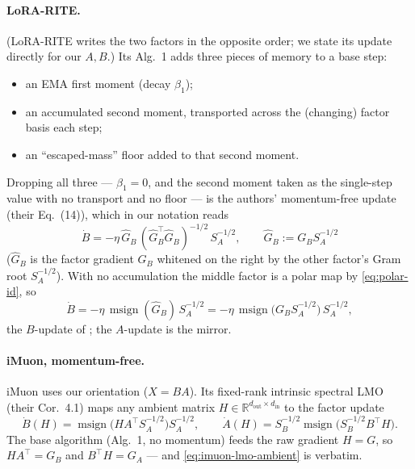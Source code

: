 \documentclass[11pt]{article}
\newcommand{\R}{\mathbb{R}}
\DeclareMathOperator{\polar}{msign}          %
\theoremstyle{plain}
\theoremstyle{definition}
\theoremstyle{remark}
\begin{document}
\paragraph{LoRA-RITE.} (LoRA-RITE writes the two factors in the opposite order; we state its
update directly for our $A,B$.) Its Alg.~1 adds three pieces of memory to a base step:
\begin{itemize}[leftmargin=1.5em,itemsep=1pt,topsep=2pt]
  \item an EMA first moment (decay $\beta_1$);
  \item an accumulated second moment, transported across the (changing) factor basis each step;
  \item an ``escaped-mass'' floor added to that second moment.
\end{itemize}
Dropping all three --- $\beta_1{=}0$, and the second moment taken as the single-step value
with no transport and no floor --- is the authors' momentum-free update (their Eq.~(14)),
which in our notation reads
\begin{equation*}
  \dot B=-\eta\,\widehat G_B\,(\widehat G_B^\top\widehat G_B)^{-1/2}\,S_A^{-1/2},
  \qquad \widehat G_B:=G_B S_A^{-1/2}
\end{equation*}
($\widehat G_B$ is the factor gradient $G_B$ whitened on the right by the other factor's Gram root $S_A^{-1/2}$).
With no accumulation the middle factor is a polar map by \eqref{eq:polar-id}, so
\begin{equation*}
  \dot B=-\eta\,\polar(\widehat G_B)\,S_A^{-1/2}
  =-\eta\,\polar\!\big(G_B S_A^{-1/2}\big)\,S_A^{-1/2},
\end{equation*}
the $B$-update of ; the $A$-update is the mirror.

\paragraph{iMuon, momentum-free.} iMuon uses our orientation ($X=BA$). Its fixed-rank
intrinsic spectral LMO (their Cor.~4.1) maps any ambient matrix
$H\in\R^{d_{\mathrm{out}}\times d_{\mathrm{in}}}$ to the factor update
\begin{equation}
  \dot B(H)=\polar\!\big(HA^\top S_A^{-1/2}\big)S_A^{-1/2},\qquad
  \dot A(H)=S_B^{-1/2}\polar\!\big(S_B^{-1/2}B^\top H\big).
  \label{eq:imuon-lmo-ambient}
\end{equation}
The base algorithm (Alg.~1, no momentum) feeds the raw gradient $H=G$, so $HA^\top=G_B$ and
$B^\top H=G_A$ --- and \eqref{eq:imuon-lmo-ambient} is  verbatim.
\end{document}
